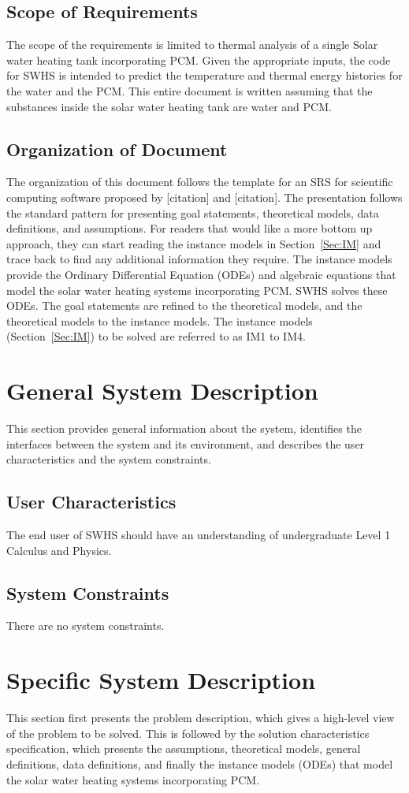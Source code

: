\documentclass[12pt]{article}
\begin{document}
\subsection{Scope of Requirements}
\label{Sec:SoR}
The scope of the requirements is limited to thermal analysis of a single Solar water heating tank incorporating PCM. Given the appropriate inputs, the code for SWHS is intended to predict the temperature and thermal energy histories for the water and the PCM. This entire document is written assuming that the substances inside the solar water heating tank are water and PCM.
\subsection{Organization of Document}
\label{Sec:OoD}
The organization of this document follows the template for an SRS for scientific computing software proposed by [citation] and [citation]. The presentation follows the standard pattern for presenting goal statements, theoretical models, data definitions, and assumptions. For readers that would like a more bottom up approach, they can start reading the instance models in Section~\ref{Sec:IM} and trace back to find any additional information they require. The instance models provide the Ordinary Differential Equation (ODEs) and algebraic equations that model the solar water heating systems incorporating PCM. SWHS solves these ODEs.
The goal statements are refined to the theoretical models, and the theoretical models to the instance models. The instance models (Section~\ref{Sec:IM}) to be solved are referred to as IM1 to IM4.
\section{General System Description}
\label{Sec:GSD}
This section provides general information about the system, identifies the interfaces between the system and its environment, and describes the user characteristics and the system constraints.
\subsection{User Characteristics}
\label{Sec:UC}
The end user of SWHS should have an understanding of undergraduate Level 1 Calculus and Physics.
\subsection{System Constraints}
\label{Sec:SC}
There are no system constraints.
\section{Specific System Description}
\label{Sec:SSD}
This section first presents the problem description, which gives a high-level view of the problem to be solved. This is followed by the solution characteristics specification, which presents the assumptions, theoretical models, general definitions, data definitions, and finally the instance models (ODEs) that model the solar water heating systems incorporating PCM.
\end{document}
